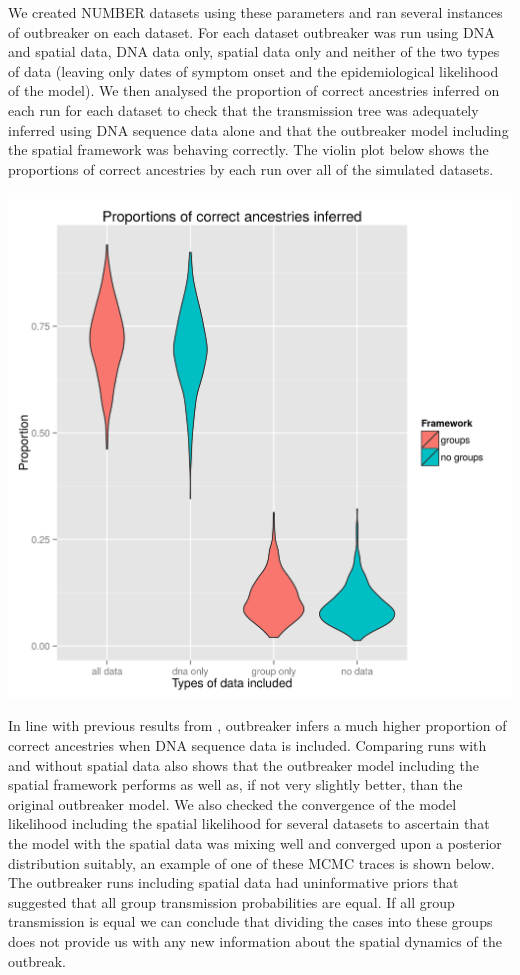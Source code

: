 \documentclass[11pt,a4paper]{report}
\begin{document}
We created NUMBER datasets using these parameters and ran several instances of outbreaker on each dataset. For each dataset outbreaker was run using DNA and spatial data, DNA data only, spatial data only and neither of the two types of data (leaving only dates of symptom onset and the epidemiological likelihood of the model). We then analysed the proportion of correct ancestries inferred on each run for each dataset to check that the transmission tree was adequately inferred using DNA sequence data alone and that the outbreaker model including the spatial framework was behaving correctly. The violin plot below shows the proportions of correct ancestries by each run over all of the simulated datasets. 
\begin{center}
\includegraphics[scale=0.6]{violin_colours.png}
\end{center}
In line with previous results from \citet{outbrkr}, outbreaker infers a much higher proportion of correct ancestries when DNA sequence data is included. Comparing runs with and without spatial data also shows that the outbreaker model including the spatial framework performs as well as, if not very slightly better, than the original outbreaker model. We also checked the convergence of the model likelihood including the spatial likelihood for several datasets to ascertain that the model with the spatial data was mixing well and converged upon a posterior distribution suitably, an example of one of these MCMC traces is shown below. The outbreaker runs including spatial data had uninformative priors that suggested that all group transmission probabilities are equal. If all group transmission is equal we can conclude that dividing the cases into these groups does not provide us with any new information about the spatial dynamics of the outbreak. 
\end{document}
